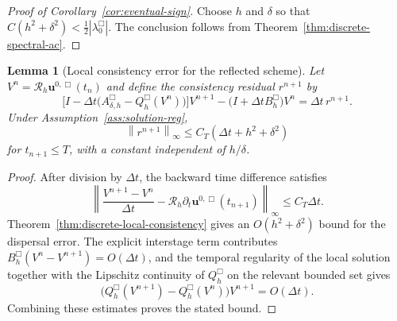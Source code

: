 \documentclass[11pt]{article}
\newtheorem{lemma}[theorem]{Lemma}
\theoremstyle{definition}
\newcommand{\cR}{\mathcal{R}}
\newcommand{\norm}[1]{\left\lVert #1\right\rVert}
\newcommand{\uvec}{\bm u}
\begin{document}
\begin{proof}[Proof of Corollary~\ref{cor:eventual-sign}]
Choose $h$ and $\delta$ so that $C(h^2+\delta^2)<\frac12|\lambda_0^{\Box}|$.  The conclusion follows from Theorem~\ref{thm:discrete-spectral-ac}.
\end{proof}

\begin{lemma}[Local consistency error for the reflected scheme]
\label{lem:local-residual}
Let $V^n=\cR_h\uvec^{0,\Box}(t_n)$ and define the consistency residual
$r^{n+1}$ by
\[
 \big[I-\Delta t\big(A_{\delta,h}^{\Box}-Q_h^{\Box}(V^n)\big)\big]V^{n+1}
 -
 \big(I+\Delta t B_h^{\Box}\big)V^n
 =
 \Delta t\,r^{n+1}.
\]
Under Assumption~\ref{ass:solution-reg},
\[
 \norm{r^{n+1}}_\infty
 \le
 C_T(\Delta t+h^2+\delta^2)
\]
for $t_{n+1}\le T$, with a constant independent of $h/\delta$.
\end{lemma}

\begin{proof}
After division by $\Delta t$, the backward time difference satisfies
\[
 \left\|
 \frac{V^{n+1}-V^n}{\Delta t}
 -
 \cR_h\partial_t\uvec^{0,\Box}(t_{n+1})
 \right\|_\infty
 \le C_T\Delta t.
\]
Theorem~\ref{thm:discrete-local-consistency} gives an
$O(h^2+\delta^2)$ bound for the dispersal error.  The explicit interstage
term contributes
$B_h^{\Box}(V^n-V^{n+1})=O(\Delta t)$, and the temporal regularity of the
local solution together with the Lipschitz continuity of $Q_h^{\Box}$ on
the relevant bounded set gives
\[
 \big(Q_h^{\Box}(V^{n+1})-Q_h^{\Box}(V^n)\big)V^{n+1}
 =
 O(\Delta t).
\]
Combining these estimates proves the stated bound.
\end{proof}
\end{document}
